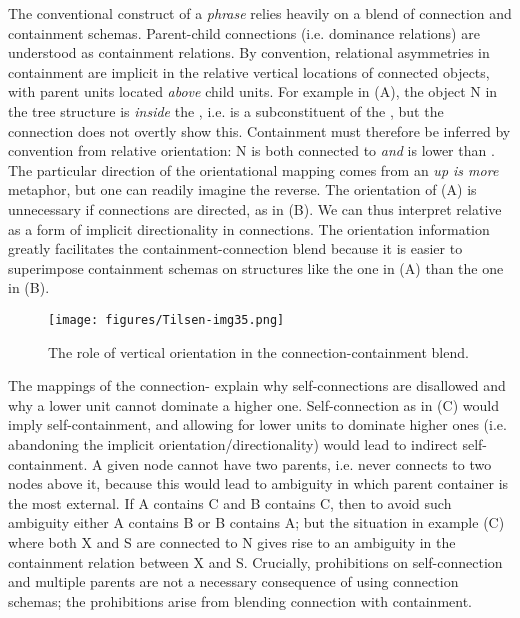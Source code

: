  The conventional construct of a \textit{phrase} relies heavily on a blend of connection and containment schemas. Parent-child connections (i.e. dominance relations) are understood as containment relations. By convention, relational asymmetries in containment are implicit in the relative vertical locations of connected objects, with parent units located \textit{above} child units. For example in {}(A), the object N in the tree structure is \textit{inside} the , i.e. is a subconstituent of the , but the connection does not overtly show this. Containment must therefore be inferred by convention from relative orientation: N is both connected to  \textit{and} is lower than . The particular direction of the orientational mapping comes from an \textit{up is more} metaphor, but one can readily imagine the reverse. The orientation of (A) is unnecessary if connections are directed, as in (B). We can thus interpret relative  as a form of implicit directionality in connections. The orientation information greatly facilitates the containment-connection blend because it is easier to superimpose containment schemas on structures like the one in (A) than the one in (B). 

  
\begin{figure}
\texttt{[image: figures/Tilsen-img35.png]}
\caption{The role of vertical orientation in the connection-containment blend.}
\label{fig:3:7}
\end{figure}
 

  The mappings of the connection- explain why self-con\-nec\-tions are disallowed and why a lower unit cannot dominate a higher one. Self-con\-nec\-tion as in (C) would imply self-containment, and allowing for lower units to dominate higher ones (i.e. abandoning the implicit orientation/directionality) would lead to indirect self-containment. A given node cannot have two parents, i.e. never connects to two nodes above it, because this would lead to ambiguity in which parent container is the most external. If A contains C and B contains C, then to avoid such ambiguity either A contains B or B contains A; but the situation in example {}(C) where both X and S are connected to N gives rise to an ambiguity in the containment relation between X and S. Crucially, prohibitions on self-connection and multiple parents are not a necessary consequence of using connection schemas; the prohibitions arise from blending connection with containment.

